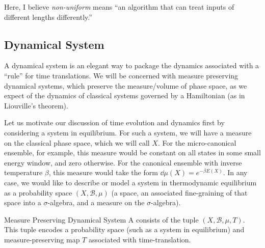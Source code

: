 Here, I believe \textit{non-uniform} means ``an algorithm that can treat inputs of different lengths differently.''



\subsection{Dynamical System}
A dynamical system is an elegant way to package the dynamics associated with a ``rule'' for time translations.
%
We will be concerned with measure preserving dynamical systems, which preserve the measure/volume of phase space, as we expect of the dynamics of classical systems governed by a Hamiltonian (as in Liouville's theorem).

Let us motivate our discussion of time evolution and dynamics first by considering a system in equilibrium.
%
For such a system, we will have a measure on the classical phase space, which we will call \(X\).
%
For the micro-canonical ensemble, for example, this measure would be constant on all states in some small energy window, and zero otherwise.
%
For the canonical ensemble with inverse temperature \(\beta\), this measure would take the form \(\dd\mu(X) = e^{-\beta E(X)}\).
%
In any case, we would like to describe or model a system in thermodynamic equilibrium as a probability space \((X, \mathcal{B}, \mu)\) (a space, an associated fine-graining of that space into a \(\sigma\)-algebra, and a measure on the \(\sigma\)-algebra).

\begin{definition}{Measure Preserving Dynamical System}{}
    A  consists of the tuple \((X, \mathcal{B}, \mu, T)\).
    This tuple encodes a probability space (such as a system in equilibrium) and measure-preserving map \(T\) associated with time-translation.
\end{definition}

